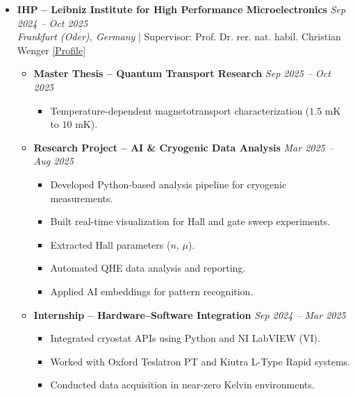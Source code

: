 \documentclass[10pt, a4paper]{article}
\begin{document}
\begin{itemize}
  \item \textbf{IHP – Leibniz Institute for High Performance Microelectronics} \hfill \textit{Sep 2024 -- Oct 2025} \\
  \textit{Frankfurt (Oder), Germany} \quad | \quad Supervisor: Prof. Dr. rer. nat. habil. Christian Wenger \href{https://www.ihp-microelectronics.com/de/ueber-uns/organisation/abteilungen/materialforschung}{[Profile]}
  \begin{itemize}
    \item \textbf{Master Thesis – Quantum Transport Research} \hfill \textit{Sep 2025 -- Oct 2025}
    \begin{itemize}[leftmargin=1.2em]
      \item Temperature-dependent magnetotransport characterization ($1.5\text{ mK}$ to $10\text{ mK}$).
    \end{itemize}

    \item \textbf{Research Project – AI \& Cryogenic Data Analysis} \hfill \textit{Mar 2025 -- Aug 2025}
    \begin{itemize}[leftmargin=1.2em, itemsep=1.5pt]
      \item Developed Python-based analysis pipeline for cryogenic measurements.
      \item Built real-time visualization for Hall and gate sweep experiments.
      \item Extracted Hall parameters ($n$, $\mu$).
      \item Automated QHE data analysis and reporting.
      \item Applied AI embeddings for pattern recognition.
    \end{itemize}

    \item \textbf{Internship – Hardware--Software Integration} \hfill \textit{Sep 2024 -- Mar 2025}
    \begin{itemize}[leftmargin=1.2em]
      \item Integrated cryostat APIs using Python and NI LabVIEW (VI).
      \item Worked with Oxford Teslatron PT and Kiutra L-Type Rapid systems.
      \item Conducted data acquisition in near-zero Kelvin environments.
    \end{itemize}
  \end{itemize}
\end{itemize}
\vspace{0.4em}
\end{document}
